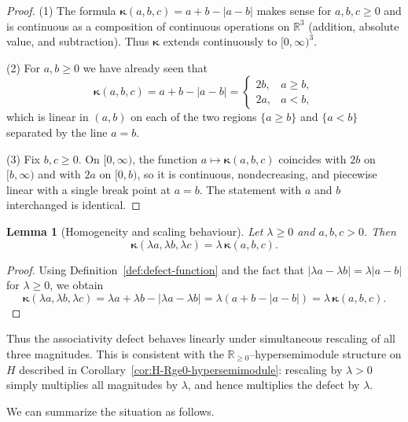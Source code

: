 \documentclass[11pt]{amsart}
\numberwithin{equation}{section}
\newtheorem{lemma}[theorem]{Lemma}
\theoremstyle{definition}
\theoremstyle{remark}
\newcommand{\R}{\mathbb{R}}
\newcommand{\Hnum}{H}                      %
\newcommand{\AssocCurv}{\boldsymbol{\kappa}} %
\begin{document}
\begin{proof}
(1) The formula $\AssocCurv(a,b,c)=a+b-|a-b|$ makes sense for
$a,b,c\ge0$ and is continuous as a composition of continuous
operations on $\R^3$ (addition, absolute value, and subtraction).
Thus $\AssocCurv$ extends continuously to $[0,\infty)^3$.

(2) For $a,b\ge0$ we have already seen that
\[
  \AssocCurv(a,b,c) = a+b-|a-b|
  =
  \begin{cases}
    2b, & a\ge b,\\
    2a, & a<b,
  \end{cases}
\]
which is linear in $(a,b)$ on each of the two regions $\{a\ge b\}$ and
$\{a<b\}$ separated by the line $a=b$.

(3) Fix $b,c\ge0$.  On $[0,\infty)$, the function
$a\mapsto\AssocCurv(a,b,c)$ coincides with $2b$ on $[b,\infty)$ and with
$2a$ on $[0,b)$, so it is continuous, nondecreasing, and piecewise
linear with a single break point at $a=b$.  The statement with $a$ and
$b$ interchanged is identical.
\end{proof}

\begin{lemma}[Homogeneity and scaling behaviour]
\label{lem:defect-homogeneity}
Let $\lambda\ge0$ and $a,b,c>0$.  Then
\[
  \AssocCurv(\lambda a,\lambda b,\lambda c)
  = \lambda\,\AssocCurv(a,b,c).
\]
\end{lemma}

\begin{proof}
Using Definition~\ref{def:defect-function} and the fact that
$|\lambda a-\lambda b|=\lambda|a-b|$ for $\lambda\ge0$, we obtain
\[
  \AssocCurv(\lambda a,\lambda b,\lambda c)
  = \lambda a + \lambda b - |\lambda a - \lambda b|
  = \lambda(a+b-|a-b|)
  = \lambda\,\AssocCurv(a,b,c).
\]
\end{proof}

Thus the associativity defect behaves linearly under simultaneous
rescaling of all three magnitudes.  This is consistent with the
$\R_{\ge0}$–hypersemimodule structure on $\Hnum$ described in
Corollary~\ref{cor:H-Rge0-hypersemimodule}: rescaling by $\lambda>0$
simply multiplies all magnitudes by $\lambda$, and hence multiplies
the defect by $\lambda$.

\medskip

We can summarize the situation as follows.
\end{document}
